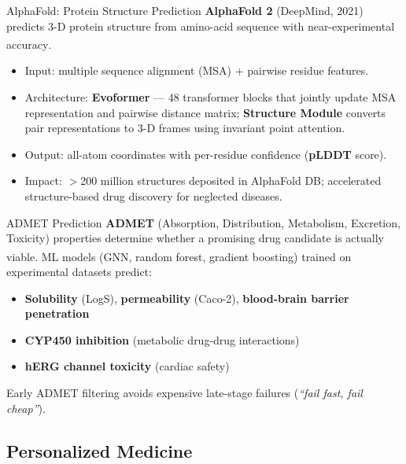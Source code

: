 \begin{v3topic}{{AlphaFold: Protein Structure Prediction}}
    \textbf{AlphaFold 2} (DeepMind, 2021) predicts 3-D protein structure from amino-acid sequence with near-experimental accuracy\textsuperscript{\cite[][p.~583]{jumperHighlyAccurateProtein2021}}.
    \begin{itemize}
        \item Input: multiple sequence alignment (MSA) + pairwise residue features.
        \item Architecture: \textbf{Evoformer} — 48 transformer blocks that jointly update MSA representation and pairwise distance matrix; \textbf{Structure Module} converts pair representations to 3-D frames using invariant point attention.
        \item Output: all-atom coordinates with per-residue confidence (\textbf{pLDDT} score).
        \item Impact: $>$200 million structures deposited in AlphaFold DB; accelerated structure-based drug discovery for neglected diseases.
    \end{itemize}

\end{v3topic}
\begin{v3topic}{ADMET Prediction}
    \textbf{ADMET} (Absorption, Distribution, Metabolism, Excretion, Toxicity) properties determine whether a promising drug candidate is actually viable\textsuperscript{\cite[][pp.~75--88]{blassDrugDiscoveryDevelopment2015}}.
    ML models (GNN, random forest, gradient boosting) trained on experimental datasets predict:
    \begin{itemize}
        \item \textbf{Solubility} (LogS), \textbf{permeability} (Caco-2), \textbf{blood-brain barrier penetration}
        \item \textbf{CYP450 inhibition} (metabolic drug-drug interactions)
        \item \textbf{hERG channel toxicity} (cardiac safety)
    \end{itemize}
    Early ADMET filtering avoids expensive late-stage failures (\textit{``fail fast, fail cheap''}).
\end{v3topic}

\subsection{Personalized Medicine}

